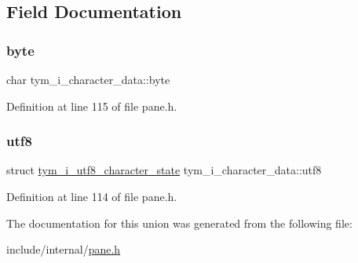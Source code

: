 \subsection{Field Documentation}
\mbox{\label{uniontym__i__character__data_a128f7b66e5071854606106ee3801fafb}} 
\subsubsection{\texorpdfstring{byte}{byte}}
{\footnotesize\ttfamily char tym\+\_\+i\+\_\+character\+\_\+data\+::byte}



Definition at line 115 of file pane.\+h.

\mbox{\label{uniontym__i__character__data_ad0a8e001d32643615c5265e9af3b9079}} 
\subsubsection{\texorpdfstring{utf8}{utf8}}
{\footnotesize\ttfamily struct \hyperlink{structtym__i__utf8__character__state}{tym\+\_\+i\+\_\+utf8\+\_\+character\+\_\+state} tym\+\_\+i\+\_\+character\+\_\+data\+::utf8}



Definition at line 114 of file pane.\+h.



The documentation for this union was generated from the following file\+:\begin{DoxyCompactItemize}
\item 
include/internal/\hyperlink{pane_8h}{pane.\+h}\end{DoxyCompactItemize}

